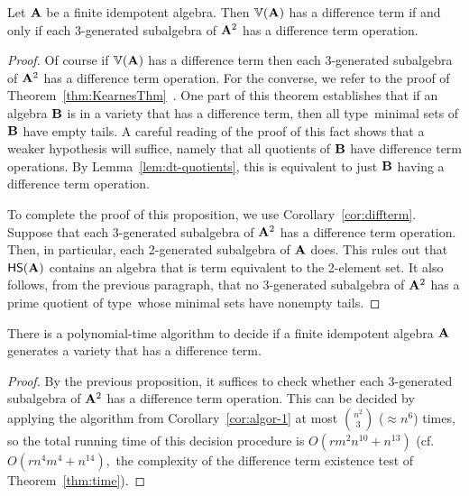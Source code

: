 \begin{prop}\label{prop:alt-poly-alg}
  Let $\mathbf{A}$ be a finite idempotent algebra.  Then $\operatorname{\mathbb{V}} (\mathbf{A})$ has a difference term if and only if each 3-generated subalgebra of $\mathbf{A}^2$ has a difference term operation.
\end{prop}

\begin{proof}
  Of course if $\operatorname{\mathbb{V}} (\mathbf{A})$ has a difference term then each 3-generated subalgebra of
  $\mathbf{A}^2$ has a difference term operation. For the converse, we refer to the proof of
  Theorem~\ref{thm:KearnesThm}~\cite[Theorem 3.8]{MR1358491}.  One part of this theorem
  establishes that if an algebra $\mathbf{B}$ is in a variety that has a difference term,
  then all type~\atyp minimal sets of $\mathbf{B}$ have empty tails.  A careful reading of the
  proof of this fact shows that a weaker hypothesis will suffice, namely that all quotients
  of $\mathbf{B}$ have difference term operations.  By Lemma~\ref{lem:dt-quotients}, this is
  equivalent to just $\mathbf{B}$ having a difference term operation.

  To complete the proof of this proposition, we use Corollary~\ref{cor:diffterm}. Suppose that each 3-generated subalgebra of $\mathbf{A}^2$ has a difference term operation.  Then, in particular, each 2-generated subalgebra of $\mathbf{A}$ does.  This rules out that $\mathsf{H} \mathsf{S} (\mathbf{A})$ contains an algebra that is term equivalent to the 2-element set.  It also follows, from the previous paragraph, that no 3-generated subalgebra of $\mathbf{A}^2$ has a prime quotient of type~\atyp whose minimal sets have nonempty tails.
\end{proof}

\begin{corollary}
  There is a polynomial-time algorithm to decide if a finite idempotent algebra $\mathbf{A}$ generates a variety that has a difference term.
\end{corollary}

\begin{proof}
  By the previous proposition, it suffices to check whether each 3-generated subalgebra of
  $\mathbf{A}^2$ has a difference term operation. This can be decided by applying the
  algorithm from Corollary~\ref{cor:algor-1} at most $\binom{n^2}{3}$ ($\approx n^6$) times,
  so the total running time of this decision procedure is $O(rm^2n^{10} + n^{13})$ (cf.~$O(rn^4m^4 + n^{14}),$
  the complexity of the difference term existence test of Theorem~\ref{thm:time}).
\end{proof}

